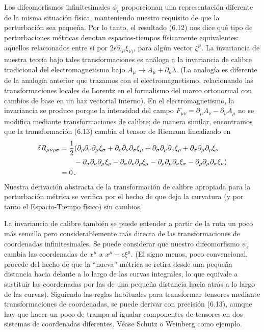 \documentclass[11pt,b5paper,openany,twoside]{book}
\newcommand{\mn}{{\mu\nu}}
\newcommand{\p}[1]{{\partial_{#1}}}
\begin{document}
Los difeomorfismos infinitesimales $\phi_\epsilon$ proporcionan una representación diferente de la misma situación física, manteniendo nuestro requisito de que la perturbación sea pequeña.
Por lo tanto, el resultado (6.12) nos dice qué tipo de perturbaciones métricas denotan espacios-tiempos físicamente equivalentes: aquellos relacionados entre sí por $2\epsilon\partial_{(\mu}\xi_{\nu)}$, para algún vector $\xi^\mu$.
La invariancia de nuestra teoría bajo tales transformaciones es análoga a la invariancia de calibre tradicional del electromagnetismo bajo $A_\mu \rightarrow A_\mu + \p\mu\lambda$.
(La analogía es diferente de la analogía anterior que trazamos con el electromagnetismo, relacionando las transformaciones locales de Lorentz en el formalismo del marco ortonormal con cambios de base en un haz vectorial interno).
En el electromagnetismo, la invariancia se produce porque la intensidad del campo $F_\mn = \p\mu A_\nu - \p\nu A_\mu$ no se modifica mediante transformaciones de calibre; de manera similar, encontramos que la transformación (6.13) cambia el tensor de Riemann linealizado en
\begin{align}
\delta R_{\mn\rho\sigma}  &=
{1\over 2}(\p\rho\p\nu\p\mu\xi_\sigma +\p\rho\p\nu\p\sigma\xi_\mu
+ \p\sigma\p\mu\p\nu\xi_\rho + \p\sigma\p\mu\p\rho\xi_\nu  \notag \\
& \qquad - \p\sigma\p\nu\p\mu\xi_\rho - \p\sigma\p\nu\p\rho\xi_\mu
- \p\rho\p\mu\p\nu\xi_\sigma - \p\rho\p\mu\p\sigma\xi_\nu ) \notag \\
&= 0\,. \label{6.14}
\end{align}
Nuestra derivación abstracta de la transformación de calibre apropiada para la perturbación métrica se verifica por el hecho de que deja la curvatura (y por tanto el Espacio-Tiempo físico) sin cambios.

La invariancia de calibre también se puede entender a partir de la ruta un poco más sencilla pero considerablemente más directa de las transformaciones de coordenadas infinitesimales.
Se puede considerar que nuestro difeomorfismo $\psi_\epsilon$ cambia las coordenadas de $x^\mu$ a $x^\mu -\epsilon\xi^\mu$.
(El signo menos, poco convencional, procede del hecho de que la ``nueva'' métrica se retira desde una pequeña distancia hacia delante a lo largo de las curvas integrales, lo que equivale a sustituir las coordenadas por las de una pequeña distancia hacia atrás a lo largo de las curvas).
Siguiendo las reglas habituales para transformar tensores mediante transformaciones de coordenadas, se puede derivar con precisión (6.13), aunque hay que hacer un poco de trampa al igualar componentes de tensores en dos sistemas de coordenadas diferentes.
Véase Schutz o Weinberg como ejemplo.
\end{document}
